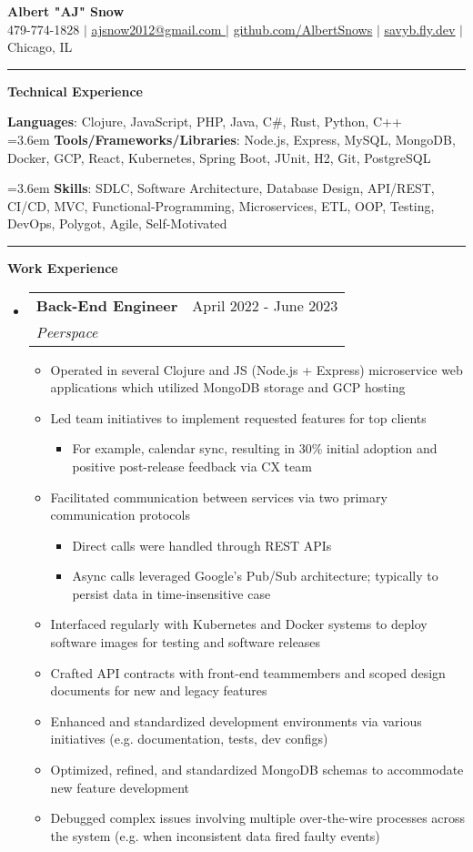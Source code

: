\documentclass[letterpaper,11pt]{article}
\makeatletter
\newcommand{\resumeItem}[1]{
  \item\small{
    {#1 \vspace{-2pt}}
  }
}
\newcommand{\resumeSubheading}[4]{
  \vspace{-2pt}\item
    \begin{tabular*}{0.97\textwidth}[t]{l@{\extracolsep{\fill}}r}
      \textbf{#1} & #2 \\
      \textit{\small#3} & \textit{\small #4} \\
    \end{tabular*}\vspace{0pt}
}
\newcommand{\resumeSubHeadingListStart}{\begin{itemize}[leftmargin=0.15cm, label={}]}
\newcommand{\resumeSubHeadingListEnd}{\end{itemize}}
\newcommand{\resumeItemListStart}{\begin{itemize}}
\newcommand{\resumeItemListEnd}{\end{itemize}\vspace{-5pt}}
\makeatother
\begin{document}
\textbf{\normalshape \Large \textcolor{magic_blue}{Albert "AJ" Snow}} \\ \vspace{3pt}
\small 479-774-1828 $|$ 
\href{ mailto:ajsnow2012@gmail.com }
{\underline{ ajsnow2012@gmail.com }} $|$
\href{https://github.com/AlbertSnows}{\underline{github.com/AlbertSnows}}
$|$ \href{https://savyb.fly.dev/}{\underline{savyb.fly.dev}}
$|$ Chicago, IL
\noindent\rule{19.5cm}{0.4pt}

%
\textbf{\large \textcolor{magic_blue}{Technical Experience} }
\begin{onehalfspace}

  \textbf{ Languages}{: Clojure, JavaScript, PHP, Java, C\#, Rust, Python, C++ } \\

  \hangindent=3.6em
  \textbf{ Tools/Frameworks/Libraries}{:
    Node.js, Express, MySQL, MongoDB, Docker,
    GCP, React, Kubernetes, Spring Boot, JUnit, H2,
    Git,  PostgreSQL } \\
\end{onehalfspace}

\hangindent=3.6em
\textbf{ Skills}{: }
SDLC, Software Architecture, Database Design, API/REST, CI/CD,
MVC, Functional-Programming, Microservices, ETL, OOP, Testing,
DevOps, Polygot, Agile, Self-Motivated
\noindent\rule{19.5cm}{0.4pt}

\textbf{\large \textcolor{magic_blue}{Work Experience}}
\resumeSubHeadingListStart
\resumeSubheading
{Back-End Engineer}{April 2022 - June 2023}
{Peerspace}{}
\resumeItemListStart
\resumeItem{Operated in several Clojure and JS (Node.js + Express) microservice web applications which utilized MongoDB storage and GCP hosting}
\resumeItem{ Led team initiatives to implement requested features for top clients }
\begin{itemize}
  \item For example, calendar sync, resulting in 30\% initial adoption and positive post-release feedback via CX team
\end{itemize}
\resumeItem{Facilitated communication between services via two primary communication protocols}
\begin{itemize}
  \item Direct calls were handled through REST APIs
  \item Async calls leveraged Google's Pub/Sub architecture; typically to persist data in time-insensitive case
\end{itemize}
\resumeItem{Interfaced regularly with Kubernetes and Docker systems to deploy software images for testing and software releases}
\resumeItem{Crafted API contracts with front-end teammembers and scoped design documents for new and legacy features}
\resumeItem{Enhanced and standardized development environments via various initiatives (e.g. documentation, tests, dev configs)}
\resumeItem{Optimized, refined, and standardized MongoDB schemas to accommodate new feature development}
\resumeItem{Debugged complex issues involving multiple over-the-wire processes across the system (e.g. when inconsistent data fired faulty events) }
\resumeItemListEnd
\resumeSubHeadingListEnd
\end{document}
